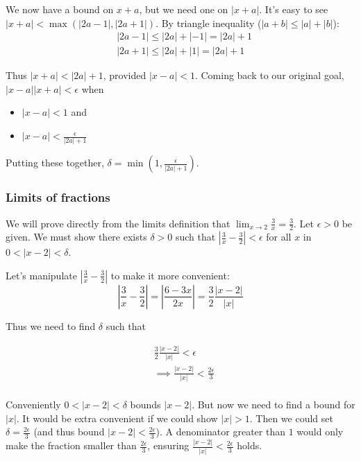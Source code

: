 We now have a bound on $x+a$, but we need one on $|x+a|$. It's easy to
see $|x+a|<\max(|2a-1|, |2a+1|)$. By triangle inequality
($|a+b|\leq|a|+|b|$):
\begin{align*}
    &|2a-1|\leq|2a|+|-1|=|2a|+1\\
    &|2a+1|\leq|2a|+|1|=|2a|+1
\end{align*}

Thus $|x+a|<|2a|+1$, provided $|x-a|<1$. Coming back to our original
goal, $|x-a||x+a|<\epsilon$ when

\begin{itemize}
    \item $|x-a|<1$ and
    \item $|x-a|<\frac{\epsilon}{|2a|+1}$
\end{itemize}

Putting these together, $\delta=\min(1, \frac{\epsilon}{|2a|+1})$.

\subsubsection*{Limits of fractions}

We will prove directly from the limits definition that
$\lim_{x\to 2}\frac{3}{x}=\frac{3}{2}$. Let $\epsilon>0$ be given. We must show
there exists $\delta>0$ such that $|\frac{3}{x}-\frac{3}{2}|<\epsilon$ for all
$x$ in $0<|x-2|<\delta$.

\vs

Let's manipulate $|\frac{3}{x}-\frac{3}{2}|$ to make it more convenient:
\[\left|\frac{3}{x}-\frac{3}{2}\right|=\left|\frac{6-3x}{2x}\right|=\frac{3}{2}\frac{|x-2|}{|x|}\]

Thus we need to find $\delta$ such that

\begin{align*}
&\frac{3}{2}\frac{|x-2|}{|x|}<\epsilon\\
&\implies \frac{|x-2|}{|x|}<\frac{2\epsilon}{3}\\
\end{align*}

Conveniently $0<|x-2|<\delta$ bounds $|x-2|$. But now we need to find a
bound for $|x|$. It would be extra convenient if we could show
$|x|>1$. Then we could set $\delta=\frac{2\epsilon}{3}$ (and thus bound
$|x-2|<\frac{2\epsilon}{3}$). A denominator greater than $1$ would only make
the fraction smaller than $\frac{2\epsilon}{3}$, ensuring
$\frac{|x-2|}{|x|}<\frac{2\epsilon}{3}$ holds.

\vs

